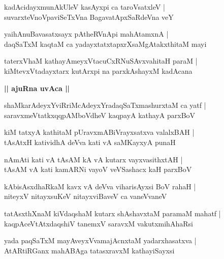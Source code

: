 \documentclass[twoside,12pt,openright]{book}
\newcounter{shloka}[chapter]
\def\uvaca#1{\centerline{{\large\textbf{#1}}}}
\begin{document}
\begin{shloka}%
kadAcidayxmunAkUleV kasAyxpi ca taroVsatxleV |\\
suvarxteVnoVpaviSeTxVna BagavatApxSaRdeVna veY 
\end{shloka}

\begin{shloka}%
yaihAnuBavasatxsayx pAtheRVnApi mahAtamxnA |\\
daqSaTxM kaqtaM ca yadayxtatxtapxrXsaMgAtakxthitaM mayi 
\end{shloka}

\begin{shloka}%
taterxVhaM kathayAmeyxVtacuCxRNuSAvxvahitaH paraM |\\
kiMtevxVtadayxtarx kutArxpi na parxkAshayxM kadAcana 
\end{shloka}

\uvaca{|| ajuRna uvAca ||}

\begin{shloka}%
shaMkarAdeyxYviRriMcAdeyxYradaqSaTxmashurxtaM ca yatf |\\
saravxmeVtatkxqqpAMboVdheV kaqpayA kathayA parxBoV 
\end{shloka}

\begin{shloka}%
kiM tatxyA kathitaM pUravxmABiVrayxsatxva valalxBAH |\\
tAsAtxH katividhA deVva kati vA saMKayxyA punaH 
\end{shloka}

\begin{shloka}%
nAmAti kati vA tAsAM kA vA kutarx vayxvasithxtAH |\\
tAsAM vA kati kamARNi vayoV veVSashacx kaH parxBoV 
\end{shloka}

\begin{shloka}%
kAbisAsxdhaRkaM kavx vA deVva viharisAyxsi BoV rahaH |\\
niteyxV nitayxsuKeV nitayxviBaveV ca vaneVvaneV 
\end{shloka}

\begin{shloka}%
tatAsxthXnaM kiVdaqshaM kutarx shAshavxtaM paramaM mahatf |\\
kaqpAceVtAtxdaqshiV tanemxV saravxM vakutxmihAhaRsi 
\end{shloka}

\begin{shloka}%
yada paqSaTxM mayAveyxVvamajAcnxtaM yadarxhasatxva |\\
AtARtiRGanx mahABAga tatasxravxM kathayiSayxsi 
\end{shloka}
\end{document}
